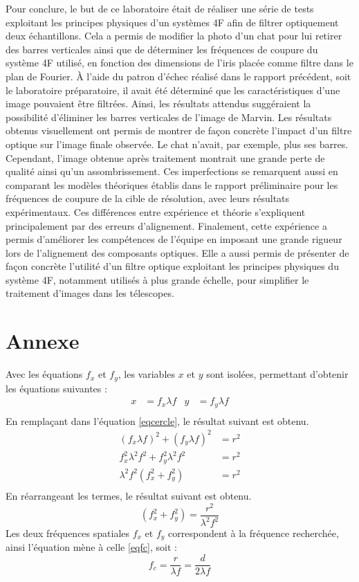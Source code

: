 \documentclass[11pt,letterpaper]{article}
\begin{document}
Pour conclure, le but de ce laboratoire était de réaliser une série de tests exploitant les principes physiques d'un systèmes 4F afin de filtrer optiquement deux échantillons. Cela a permis de modifier la photo d'un chat pour lui retirer des barres verticales ainsi que de déterminer les fréquences de coupure du système 4F utilisé, en fonction des dimensions de l'iris placée comme filtre dans le plan de Fourier. À l'aide du patron d'échec réalisé dans le rapport précédent, soit le laboratoire préparatoire, il avait été déterminé que les caractéristiques d'une image pouvaient être filtrées. Ainsi, les résultats attendus suggéraient la possibilité d'éliminer les barres verticales de l'image de Marvin. Les résultats obtenus visuellement ont permis de montrer de façon concrète l'impact d'un filtre optique sur l'image finale observée. Le chat n'avait, par exemple, plus ses barres. Cependant, l'image obtenue après traitement montrait une grande perte de qualité ainsi qu'un assombrissement. Ces imperfections se remarquent aussi en comparant les modèles théoriques établis dans le rapport préliminaire pour les fréquences de coupure de la cible de résolution, avec leurs résultats expérimentaux. Ces différences entre expérience et théorie s'expliquent principalement par des erreurs d'alignement. Finalement, cette expérience a permis d'améliorer les compétences de l'équipe en imposant une grande rigueur lors de l'alignement des composants optiques. Elle a aussi permis de présenter de façon concrète l'utilité d'un filtre optique exploitant les principes physiques du système 4F, notamment utilisés à plus grande échelle, pour simplifier le traitement d'images dans les télescopes. 

\newpage\section*{Annexe}
Avec les équations $f_{x}$ et $f_{y}$, les variables $x$ et $y$ sont isolées, permettant d'obtenir les équations suivantes :
\begin{align*}
  x&=f_{x}\lambda f & y&=f_{y}\lambda f \\
\end{align*}
En remplaçant dans l'équation \ref{eqcercle}, le résultat suivant est obtenu.
\begin{align*}
  (f_{x}\lambda f)^{2}+(f_{y}\lambda f)^{2}&=r^{2} \\
  f_{x}^{2}\lambda^{2}f^{2}+f_{y}^{2}\lambda^{2}f^{2}&=r^{2} \\
  \lambda^{2}f^{2}(f_{x}^{2}+f_{y}^{2})&=r^{2} \\
\end{align*}
En réarrangeant les termes, le résultat suivant est obtenu.
\begin{equation*}
  (f_{x}^{2}+f_{y}^{2})=\frac{r^{2}}{\lambda^{2}f^{2}}
\end{equation*}
Les deux fréquences spatiales $f_{x}$ et $f_{y}$ correspondent à la fréquence recherchée, ainsi l'équation mène à celle \ref{eqfc}, soit :
\begin{equation*}
  f_{c}=\frac{r}{\lambda f}=\frac{d}{2\lambda f}
\end{equation*} 

\clearpage



\end{document}

